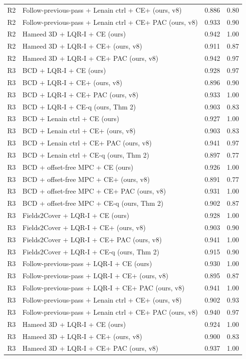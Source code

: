 \documentclass[preprint,12pt,authoryear]{elsarticle}
\begin{document}
\begin{longtable}{@{}l>{\raggedright\arraybackslash}p{20.8em}ll@{}}
R2 & Follow-previous-pass + Lenain ctrl + CE+ (ours, v8) & 0.886 & 0.80 \\
R2 & Follow-previous-pass + Lenain ctrl + CE+ PAC (ours, v8) & 0.933 & 0.90 \\
R2 & Hameed 3D + LQR-I + CE (ours) & 0.942 & 1.00 \\
R2 & Hameed 3D + LQR-I + CE+ (ours, v8) & 0.911 & 0.87 \\
R2 & Hameed 3D + LQR-I + CE+ PAC (ours, v8) & 0.942 & 0.97 \\
R3 & BCD + LQR-I + CE (ours) & 0.928 & 0.97 \\
R3 & BCD + LQR-I + CE+ (ours, v8) & 0.896 & 0.90 \\
R3 & BCD + LQR-I + CE+ PAC (ours, v8) & 0.933 & 1.00 \\
R3 & BCD + LQR-I + CE-q (ours, Thm 2) & 0.903 & 0.83 \\
R3 & BCD + Lenain ctrl + CE (ours) & 0.927 & 1.00 \\
R3 & BCD + Lenain ctrl + CE+ (ours, v8) & 0.903 & 0.83 \\
R3 & BCD + Lenain ctrl + CE+ PAC (ours, v8) & 0.941 & 0.97 \\
R3 & BCD + Lenain ctrl + CE-q (ours, Thm 2) & 0.897 & 0.77 \\
R3 & BCD + offset-free MPC + CE (ours) & 0.926 & 1.00 \\
R3 & BCD + offset-free MPC + CE+ (ours, v8) & 0.891 & 0.77 \\
R3 & BCD + offset-free MPC + CE+ PAC (ours, v8) & 0.931 & 1.00 \\
R3 & BCD + offset-free MPC + CE-q (ours, Thm 2) & 0.902 & 0.87 \\
R3 & Fields2Cover + LQR-I + CE (ours) & 0.928 & 1.00 \\
R3 & Fields2Cover + LQR-I + CE+ (ours, v8) & 0.903 & 0.90 \\
R3 & Fields2Cover + LQR-I + CE+ PAC (ours, v8) & 0.941 & 1.00 \\
R3 & Fields2Cover + LQR-I + CE-q (ours, Thm 2) & 0.915 & 0.90 \\
R3 & Follow-previous-pass + LQR-I + CE (ours) & 0.930 & 1.00 \\
R3 & Follow-previous-pass + LQR-I + CE+ (ours, v8) & 0.895 & 0.87 \\
R3 & Follow-previous-pass + LQR-I + CE+ PAC (ours, v8) & 0.941 & 1.00 \\
R3 & Follow-previous-pass + Lenain ctrl + CE+ (ours, v8) & 0.902 & 0.93 \\
R3 & Follow-previous-pass + Lenain ctrl + CE+ PAC (ours, v8) & 0.940 & 0.97 \\
R3 & Hameed 3D + LQR-I + CE (ours) & 0.924 & 1.00 \\
R3 & Hameed 3D + LQR-I + CE+ (ours, v8) & 0.900 & 0.83 \\
R3 & Hameed 3D + LQR-I + CE+ PAC (ours, v8) & 0.937 & 1.00 \\
\end{longtable}
\endgroup
\end{document}
